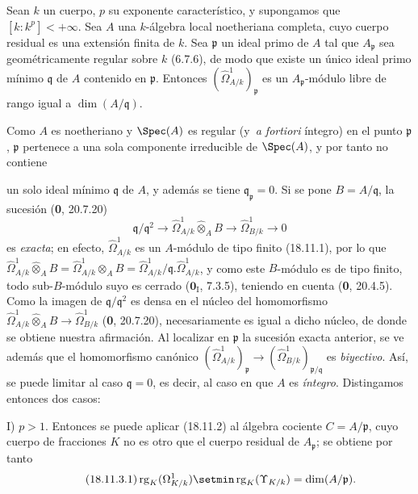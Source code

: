 \begin{lemma}[18.11.3]
\label{IV.18.11.3}
Sean $k$ un cuerpo, $p$ su exponente característico, y supongamos que $[k:k^p]<+\infty$. Sea $A$ una $k$-álgebra local noetheriana \textup{completa}, cuyo cuerpo residual es una extensión \textup{finita} de $k$. Sea $\mathfrak p$ un ideal primo de $A$ tal que $A_{\mathfrak p}$ sea \textup{geométricamente regular} sobre $k$ \textup{(6.7.6)}, de modo que existe un único ideal primo mínimo $\mathfrak q$ de $A$ contenido en $\mathfrak p$. Entonces $(\hat{\Omega}^1_{A/k})_{\mathfrak p}$ es un $A_{\mathfrak p}$-módulo libre de rango igual a $\dim(A/\mathfrak q)$.
\end{lemma}

Como $A$ es noetheriano y $\Spec(A)$ es regular (y \,\emph{a fortiori} íntegro) en el punto $\mathfrak p$, $\mathfrak p$ pertenece a una sola componente irreducible de $\Spec(A)$, y por tanto no contiene


un solo ideal mínimo $\mathfrak q$ de $A$, y además se tiene $\mathfrak q_{\mathfrak p}=0$. Si se pone $B=A/\mathfrak q$, la sucesión (\textbf 0, 20.7.20)
\[
  \mathfrak q/\mathfrak q^2\longrightarrow
  \hat{\Omega}^1_{A/k}\widehat{\otimes}_A B
  \longrightarrow\hat{\Omega}^1_{B/k}\longrightarrow0
\]
es \emph{exacta}; en efecto, $\hat{\Omega}^1_{A/k}$ es un $A$-módulo de tipo finito (18.11.1), por lo que $\hat{\Omega}^1_{A/k}\widehat{\otimes}_A B=\hat{\Omega}^1_{A/k}\otimes_A B=\hat{\Omega}^1_{A/k}/\mathfrak q.\hat{\Omega}^1_{A/k}$, y como este $B$-módulo es de tipo finito, todo sub-$B$-módulo suyo es cerrado ($\mathbf{0}_{\mathrm I}$, 7.3.5), teniendo en cuenta (\textbf 0, 20.4.5). Como la imagen de $\mathfrak q/\mathfrak q^2$ es densa en el núcleo del homomorfismo $\hat{\Omega}^1_{A/k}\widehat{\otimes}_A B\to\hat{\Omega}^1_{B/k}$ (\textbf 0, 20.7.20), necesariamente es igual a dicho núcleo, de donde se obtiene nuestra afirmación. Al localizar en $\mathfrak p$ la sucesión exacta anterior, se ve además que el homomorfismo canónico $(\hat{\Omega}^1_{A/k})_{\mathfrak p}\to(\hat{\Omega}^1_{B/k})_{\mathfrak p/\mathfrak q}$ es \emph{biyectivo}. Así, se puede limitar al caso $\mathfrak q=0$, es decir, al caso en que $A$ es \emph{íntegro}. Distingamos entonces dos casos:

I) $p>1$. Entonces se puede aplicar (18.11.2) al álgebra cociente $C=A/\mathfrak p$, cuyo cuerpo de fracciones $K$ no es otro que el cuerpo residual de $A_{\mathfrak p}$; se obtiene por tanto
\begin{equation}
\label{IV.18.11.3.1}
\tag{18.11.3.1}
  \operatorname{rg}_K(\Omega^1_{K/k})\setmin\operatorname{rg}_K(\Upsilon_{K/k})=\dim(A/\mathfrak p).
\end{equation}

